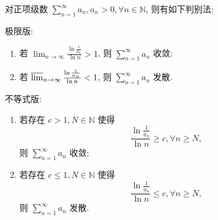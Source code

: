 \documentclass[../../main.tex]{subfiles}%
\begin{document}
\begin{theorem}[对数判别法]\label{theorem:级数-对数判别法}
对正项级数 \( \sum_{n=1}^\infty a_n, a_n > 0, \forall n \in \mathbb{N} \), 则有如下判别法:

极限版:
\begin{enumerate}
\item 若 \( \lim_{n \to \infty} \frac{\ln \frac{1}{a_n}}{\ln n} > 1 \), 则 \( \sum_{n=1}^\infty a_n \) 收敛;

\item 若 \( \varlimsup_{n \to \infty} \frac{\ln \frac{1}{a_n}}{\ln n} < 1 \), 则 \( \sum_{n=1}^\infty a_n \) 发散.
\end{enumerate}

不等式版:
\begin{enumerate}
\item 若存在 \( c > 1, N \in \mathbb{N} \) 使得
\[
\frac{\ln \frac{1}{a_n}}{\ln n} \geqslant c, \forall n \geqslant N,
\]
则 \( \sum_{n=1}^\infty a_n \) 收敛;

\item 若存在 \( c \leqslant 1, N \in \mathbb{N} \) 使得
\[
\frac{\ln \frac{1}{a_n}}{\ln n} \leqslant c, \forall n \geqslant N,
\]
则 \( \sum_{n=1}^\infty a_n \) 发散.
\end{enumerate}
\end{theorem}
\end{document}
